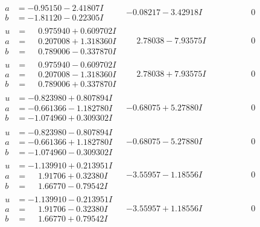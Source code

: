 \documentclass[1p]{elsarticle_modified}
\theoremstyle{definition}
\begin{document}
$$\begin{array}{c|c|c}
\begin{aligned}
a &= -0.95150 - 2.41807 I \\
b &= -1.81120 - 0.22305 I\end{aligned}
 & -0.08217 - 3.42918 I & \phantom{-0.000000 } 0 \\ \hline\begin{aligned}
u &= \phantom{-}0.975940 + 0.609702 I \\
a &= \phantom{-}0.207008 + 1.318360 I \\
b &= \phantom{-}0.789006 - 0.337870 I\end{aligned}
 & \phantom{-}2.78038 - 7.93575 I & \phantom{-0.000000 } 0 \\ \hline\begin{aligned}
u &= \phantom{-}0.975940 - 0.609702 I \\
a &= \phantom{-}0.207008 - 1.318360 I \\
b &= \phantom{-}0.789006 + 0.337870 I\end{aligned}
 & \phantom{-}2.78038 + 7.93575 I & \phantom{-0.000000 } 0 \\ \hline\begin{aligned}
u &= -0.823980 + 0.807894 I \\
a &= -0.661366 - 1.182780 I \\
b &= -1.074960 + 0.309302 I\end{aligned}
 & -0.68075 + 5.27880 I & \phantom{-0.000000 } 0 \\ \hline\begin{aligned}
u &= -0.823980 - 0.807894 I \\
a &= -0.661366 + 1.182780 I \\
b &= -1.074960 - 0.309302 I\end{aligned}
 & -0.68075 - 5.27880 I & \phantom{-0.000000 } 0 \\ \hline\begin{aligned}
u &= -1.139910 + 0.213951 I \\
a &= \phantom{-}1.91706 + 0.32380 I \\
b &= \phantom{-}1.66770 - 0.79542 I\end{aligned}
 & -3.55957 - 1.18556 I & \phantom{-0.000000 } 0 \\ \hline\begin{aligned}
u &= -1.139910 - 0.213951 I \\
a &= \phantom{-}1.91706 - 0.32380 I \\
b &= \phantom{-}1.66770 + 0.79542 I\end{aligned}
 & -3.55957 + 1.18556 I & \phantom{-0.000000 } 0 \\ \hline\begin{aligned}

\end{aligned}
\end{array}$$
\end{document}
